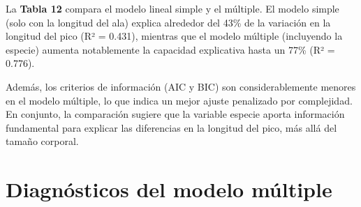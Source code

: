 \documentclass[
  spanish,
  11pt,
  a4paper,
  DIV=11,
  numbers=noendperiod]{scrartcl}
\begin{document}
La \textbf{Tabla 12} compara el modelo lineal simple y el múltiple. El
modelo simple (solo con la longitud del ala) explica alrededor del 43\%
de la variación en la longitud del pico (R² = 0.431), mientras que el
modelo múltiple (incluyendo la especie) aumenta notablemente la
capacidad explicativa hasta un 77\% (R² = 0.776).

Además, los criterios de información (AIC y BIC) son considerablemente
menores en el modelo múltiple, lo que indica un mejor ajuste penalizado
por complejidad. En conjunto, la comparación sugiere que la variable
especie aporta información fundamental para explicar las diferencias en
la longitud del pico, más allá del tamaño corporal.

\section{Diagnósticos del modelo
múltiple}\label{diagnuxf3sticos-del-modelo-muxfaltiple}
\end{document}

